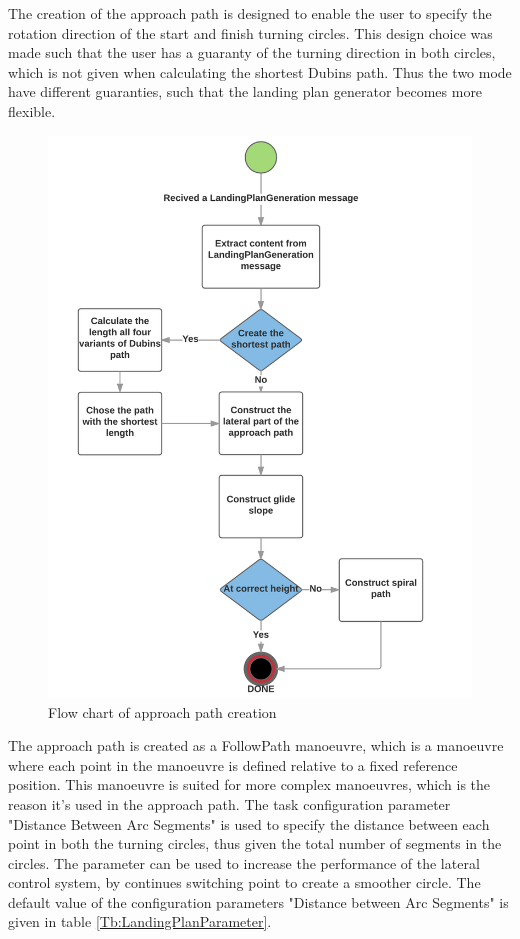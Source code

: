 The creation of the approach path is designed to enable the user to specify the rotation direction of the start and finish turning circles. This design choice was made such that the user has a guaranty of the turning direction in both circles, which is not given when calculating the shortest Dubins path. Thus the two mode have different guaranties, such that the landing plan generator becomes more flexible. 

\begin{figure}[H]
\centering
\includegraphics[scale=0.8]{figs/ApproachPath.png}
\caption{Flow chart of approach path creation}
\label{Fig:FlowChartApproach}
\end{figure}
The approach path is created as a FollowPath manoeuvre, which is a manoeuvre where each point in the manoeuvre is defined relative to a fixed reference position. This manoeuvre is suited for more complex manoeuvres, which is the reason it's used in the approach path. The task configuration parameter "Distance Between Arc Segments" is used to specify the distance between each point in both the turning circles, thus given the total number of segments in the circles. The parameter can be used to increase the performance of the lateral control system, by continues switching point to create a smoother circle. The default value of the configuration parameters "Distance between Arc Segments" is given in table \ref{Tb:LandingPlanParameter}.
